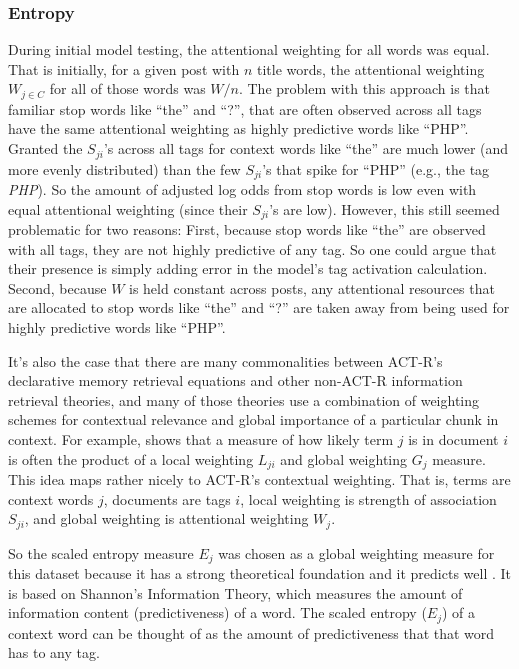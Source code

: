 \documentclass[10pt,letterpaper]{article}
\begin{document}
\subsubsection{Entropy}

During initial model testing, the attentional weighting for all words was equal.
That is initially, for a given post with $n$ title words, the attentional weighting $W_{j\in C}$ for all of those words was $W/n$.
The problem with this approach is that familiar stop words like ``the'' and ``?'', that are often observed across all tags have the same attentional weighting as highly predictive words like ``PHP''.
Granted the $S_{ji}$'s across all tags for context words like ``the'' are much lower (and more evenly distributed) than the few $S_{ji}$'s that spike for ``PHP'' (e.g., the tag \emph{PHP}).
So the amount of adjusted log odds from stop words is low even with equal attentional weighting (since their $S_{ji}$'s are low).
However, this still seemed problematic for two reasons:
First, because stop words like ``the'' are observed with all tags, they are not highly predictive of any tag.
So one could argue that their presence is simply adding error in the model's tag activation calculation.
Second, because $W$ is held constant across posts, any attentional resources that are allocated to stop words like ``the'' and ``?'' are taken away from being used for highly predictive words like ``PHP''.

It's also the case that there are many commonalities between ACT-R's declarative memory retrieval equations and other non-ACT-R information retrieval theories,
and many of those theories use a combination of weighting schemes for contextual relevance and global importance of a particular chunk in context.
For example,  shows that a measure of how likely term $j$ is in document $i$ is often the product of a local weighting $L_{ji}$ and global weighting $G_{j}$ measure.
This idea maps rather nicely to ACT-R's contextual weighting.
That is, terms are context words $j$, documents are tags $i$, local weighting is strength of association $S_{ji}$, and global weighting is attentional weighting $W_{j}$.

So the scaled entropy measure $E_{j}$ was chosen as a global weighting measure for this dataset because it has a strong theoretical foundation and it predicts well \cite{Dumais1991}.
It is based on Shannon's Information Theory, which measures the amount of information content (predictiveness) of a word.
The scaled entropy ($E_{j}$) of a context word can be thought of as the amount of predictiveness that that word has to any tag.
\end{document}
